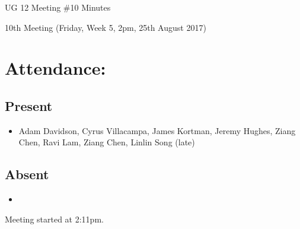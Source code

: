 \documentclass{article}
\begin{document}
\begin{adjustwidth}{2.5em}{0pt}
\begin{center}
\Large{UG 12 Meeting \#10 Minutes}\\
\end{center}
\end{adjustwidth}


10th Meeting (Friday, Week 5, 2pm, 25th August 2017)
\section{Attendance:}
\subsection*{Present}
\begin{itemize}
\item Adam Davidson, Cyrus Villacampa, James Kortman, Jeremy Hughes, Ziang Chen, Ravi Lam, Ziang Chen, Linlin Song (late)
\end{itemize}
\subsection*{Absent}
\begin{itemize}
\item
\end {itemize}

Meeting started at 2:11pm.
\end{document}
